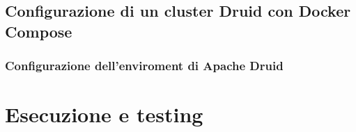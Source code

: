\subsection{Configurazione di un cluster Druid con Docker Compose}
\subsubsection{Configurazione dell'enviroment di Apache Druid}

\section{Esecuzione e testing}
\newpage
\pagestyle{empty}
\null %
\newpage